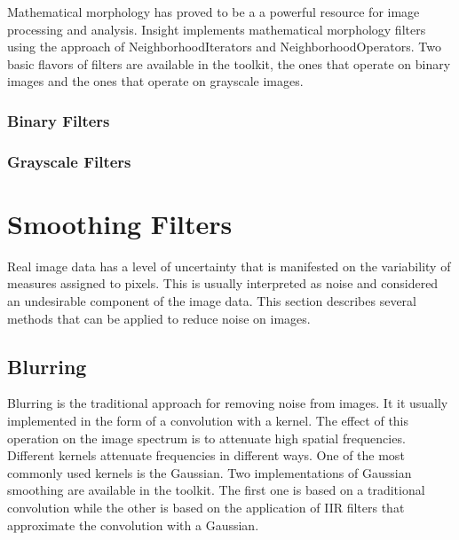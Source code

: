 Mathematical morphology has proved to be a a powerful resource for image
processing and analysis. Insight implements mathematical morphology filters
using the approach of NeighborhoodIterators and NeighborhoodOperators. Two
basic flavors of filters are available in the toolkit, the ones that operate on
binary images and the ones that operate on grayscale images. 

\subsubsection{Binary Filters}
\label{sec:MathematicalMorphologyBinaryFilters}




\subsubsection{Grayscale Filters}
\label{sec:MathematicalMorphologyGrayscaleFilters}






\section{Smoothing Filters}
\label{sec:SmoothingFilters}

Real image data has a level of uncertainty that is manifested on the
variability of measures assigned to pixels. This is usually interpreted as
noise and considered an undesirable component of the image data. This section
describes several methods that can be applied to reduce noise on images.

\subsection{Blurring}
\label{sec:BlurringFilters}

Blurring is the traditional approach for removing noise from images. It it
usually implemented in the form of a convolution with a kernel. The effect of
this operation on the image spectrum is to attenuate high spatial frequencies.
Different kernels attenuate frequencies in different ways. One of the most
commonly used kernels is the Gaussian. Two implementations of Gaussian
smoothing are available in the toolkit. The first one is based on a traditional
convolution while the other is based on the application of IIR filters that
approximate the convolution with a Gaussian. 

